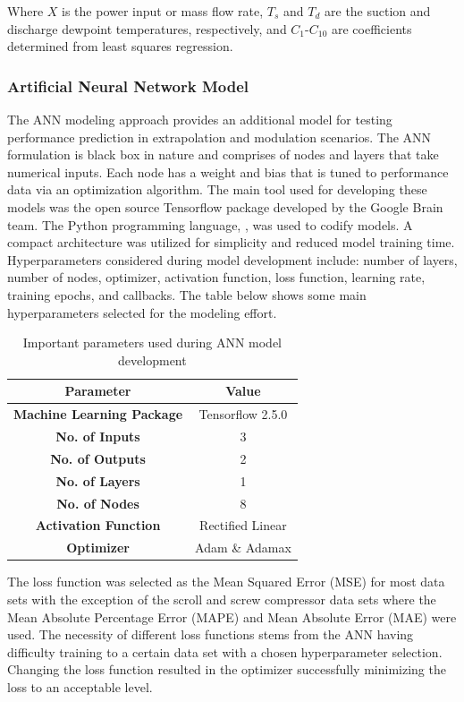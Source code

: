 \documentclass[preprint,11pt,authoryear]{elsarticle}
\begin{document}
Where $X$ is the power input or mass flow rate, $T_s$ and $T_d$ are the suction and discharge dewpoint temperatures, respectively, and $C_1$-$C_{10}$ are coefficients determined from least squares regression.

\subsubsection{Artificial Neural Network Model}

The ANN modeling approach provides an additional model for testing performance prediction in extrapolation and modulation scenarios. The ANN formulation is black box in nature and comprises of nodes and layers that take numerical inputs. Each node has a weight and bias that is tuned to performance data via an optimization algorithm. The main tool used for developing these models was the open source Tensorflow package developed by the Google Brain team. The Python programming language, \cite{P}, was used to codify models. A compact architecture was utilized for simplicity and reduced model training time. Hyperparameters considered during model development include: number of layers, number of nodes, optimizer, activation function, loss function, learning rate, training epochs, and callbacks. The table below shows some main hyperparameters selected for the modeling effort. 

\begin{table}[h]
\caption{Important parameters used during ANN model development}
\label{Tab:ann_overview}
\begin{center}
\begin{tabular}{c c}
\hline
\hline
\textbf{Parameter} & Value\\
\hline
\textbf{Machine Learning Package} & Tensorflow 2.5.0 \\
\textbf{No. of Inputs} & 3 \\
\textbf{No. of Outputs} & 2 \\
\textbf{No. of Layers} & 1 \\
\textbf{No. of Nodes} & 8 \\
\textbf{Activation Function} & Rectified Linear \\
\textbf{Optimizer} & Adam \& Adamax
\\
\hline
\hline
\end{tabular}
\end{center}
\end{table}

The loss function was selected as the Mean Squared Error (MSE) for most data sets with the exception of the scroll and screw compressor data sets where the Mean Absolute Percentage Error (MAPE) and Mean Absolute Error (MAE) were used. The necessity of different loss functions stems from the ANN having difficulty training to a certain data set with a chosen hyperparameter selection. Changing the loss function resulted in the optimizer successfully minimizing the loss to an acceptable level.
\end{document}

